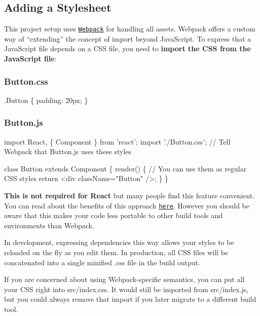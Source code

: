 \subsection*{Adding a Stylesheet}

This project setup uses \href{https://webpack.js.org/}{\tt Webpack} for handling all assets. Webpack offers a custom way of “extending” the concept of {\ttfamily import} beyond Java\+Script. To express that a Java\+Script file depends on a C\+SS file, you need to {\bfseries import the C\+SS from the Java\+Script file}\+:

\subsubsection*{{\ttfamily Button.\+css}}


\begin{DoxyCode}
.Button \{
  padding: 20px;
\}
\end{DoxyCode}


\subsubsection*{{\ttfamily Button.\+js}}


\begin{DoxyCode}
import React, \{ Component \} from 'react';
import './Button.css'; // Tell Webpack that Button.js uses these styles

class Button extends Component \{
  render() \{
    // You can use them as regular CSS styles
    return <div className="Button" />;
  \}
\}
\end{DoxyCode}


{\bfseries This is not required for React} but many people find this feature convenient. You can read about the benefits of this approach \href{https://medium.com/seek-ui-engineering/block-element-modifying-your-javascript-components-d7f99fcab52b}{\tt here}. However you should be aware that this makes your code less portable to other build tools and environments than Webpack.

In development, expressing dependencies this way allows your styles to be reloaded on the fly as you edit them. In production, all C\+SS files will be concatenated into a single minified {\ttfamily .css} file in the build output.

If you are concerned about using Webpack-\/specific semantics, you can put all your C\+SS right into {\ttfamily src/index.\+css}. It would still be imported from {\ttfamily src/index.\+js}, but you could always remove that import if you later migrate to a different build tool.

